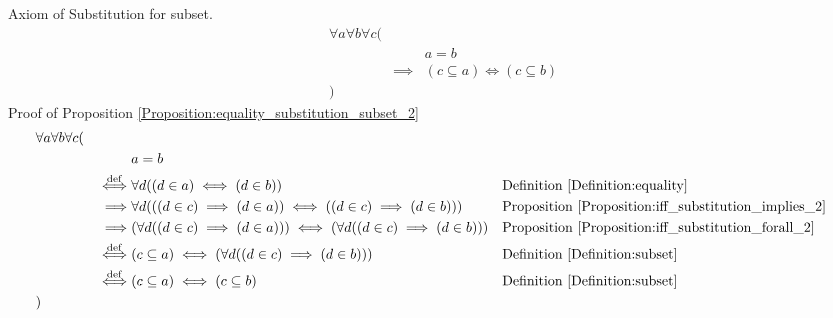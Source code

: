 \begin{prop}
\label{Proposition:equality_substitution_subset_2}
Axiom of Substitution for subset.
\begin{align*}
& \forall a \forall b \forall c ( \\
& & & a = b \\
& & \implies & (c \subseteq a) \iff (c \subseteq b) \\
& )
\end{align*}
Proof of Proposition \ref{Proposition:equality_substitution_subset_2}
\begin{align*}
& \forall a \forall b \forall c ( \\
& & & a = b \\
& & \overset{\operatorname{def}}{\iff} & \forall d ((d \in a) \iff (d \in b))
& & \text{Definition \ref{Definition:equality}} \\
& & \implies & \forall d (((d \in c) \implies (d \in a)) \iff ((d \in c) \implies (d \in b)))
& & \text{Proposition \ref{Proposition:iff_substitution_implies_2}} \\
& & \implies & (\forall d ((d \in c) \implies (d \in a))) \iff (\forall d ((d \in c) \implies (d \in b)))
& & \text{Proposition \ref{Proposition:iff_substitution_forall_2}} \\
& & \overset{\operatorname{def}}{\iff} & (c \subseteq a) \iff (\forall d ((d \in c) \implies (d \in b)))
& & \text{Definition \ref{Definition:subset}} \\
& & \overset{\operatorname{def}}{\iff} & (c \subseteq a) \iff (c \subseteq b)
& & \text{Definition \ref{Definition:subset}} \\
& )
\end{align*}
\end{prop}

